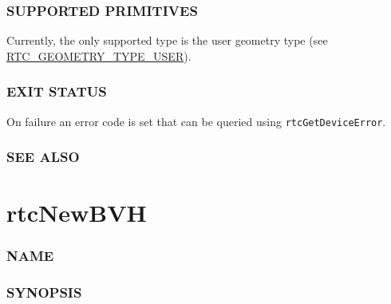 \subsubsection{SUPPORTED PRIMITIVES}\label{supported-primitives}

Currently, the only supported type is the user geometry type (see
\hyperref[rtc_geometry_type_user]{RTC\_GEOMETRY\_TYPE\_USER}).

\subsubsection{EXIT STATUS}\label{exit-status}

On failure an error code is set that can be queried using
\texttt{rtcGetDeviceError}.

\subsubsection{SEE ALSO}\label{see-also}

\pagebreak

\section{rtcNewBVH}\label{rtcnewbvh}

\subsubsection{NAME}\label{name}

\begin{Shaded}
\begin{Highlighting}[]
\OperatorTok{{-}}
\end{Highlighting}
\end{Shaded}

\subsubsection{SYNOPSIS}\label{synopsis}

\begin{Shaded}
\begin{Highlighting}[]

\OperatorTok{(}\OperatorTok{);}
\end{Highlighting}
\end{Shaded}


